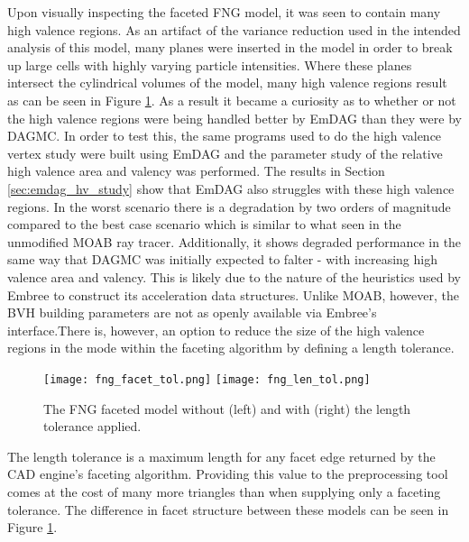 Upon visually inspecting the faceted FNG model, it was
seen to contain many high valence regions. As an artifact of the variance
reduction used in the intended analysis of this model, many planes were inserted
in the model in order to break up large cells with highly varying particle
intensities. Where these planes intersect the cylindrical volumes of the model,
many high valence regions result as can be seen in Figure
\ref{fng-faceted-models}. As a result it became a curiosity as to whether or
not the high valence regions were being handled better by EmDAG than they were
by DAGMC. In order to test this, the same programs used to do the high valence
vertex study were built using EmDAG and the parameter study of the relative high
valence area and valency was performed. The results in Section \ref{sec:emdag_hv_study}
show that EmDAG also struggles with these high valence regions. In the worst
scenario there is a degradation by two orders of magnitude compared to the best
case scenario which is similar to what seen in the unmodified MOAB ray
tracer. Additionally, it shows degraded performance in the same way that DAGMC
was initially expected to falter - with increasing high valence area and
valency. This is likely due to the nature of the heuristics used by Embree to
construct its acceleration data structures.  Unlike MOAB, however, the BVH
building parameters are not as openly available via Embree's interface.There is,
however, an option to reduce the size of the high valence regions in the mode
within the faceting algorithm by defining a length tolerance.

\begin{figure}[H]
  \small
  \begin{center}
    \texttt{[image: fng\_facet\_tol.png]}
    \texttt{[image: fng\_len\_tol.png]}
    \caption{The FNG faceted model without (left) and with (right) the length
      tolerance applied.}
    \label{fng-faceted-models}
  \end{center}
\end{figure}

The length tolerance is a maximum length for any facet edge returned by the CAD
engine's faceting algorithm. Providing this value to the preprocessing tool
comes at the cost of many more triangles than when supplying only a faceting
tolerance. The difference in facet structure between these models can be seen in
Figure \ref{fng-faceted-models}.

